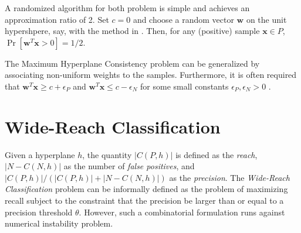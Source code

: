 \documentclass[11pt]{article}
\theoremstyle{definition}
\newcommand{\vect}[1]{\mathbf{#1}}
\begin{document}
A randomized algorithm for both problem is simple and achieves an approximation ratio of 2. 
Set $c = 0$ and choose a random vector $\vect{w}$ on the unit hypershpere, say, with the
method in \cite{rndvect}. Then, for any (positive) sample $\vect{x} \in P$,
$\Pr [ \vect{w}^T \vect{x} > 0 ] = 1 / 2$.

The Maximum Hyperplane Consistency problem can be generalized by associating
non-uniform weights to the samples. 
Furthermore, it is often required that 
$\vect{w}^T \vect{x} \geq c + \epsilon_P$ and 
$\vect{w}^T \vect{x} \leq c - \epsilon_N$
for some small constants $\epsilon_P, \epsilon_N > 0$ \cite{ClassificationOptSurvey}.


\section{Wide-Reach Classification}
Given a hyperplane $h$, the quantity $|C(P, h)|$ is defined as the {\em reach\/},
$|N - C(N,h)|$ as the number of {\em false positives\/},
and $|C(P,h)| / (|C(P,h)| + |N - C(N,h)|)$ as the {\em precision\/}.
The {\em Wide-Reach Classification\/} problem can be informally defined
as the problem of maximizing recall subject to the constraint that the precision
be larger than or equal to a precision threshold $\theta$.
However, such a combinatorial formulation runs against numerical instability problem. 




\end{document}
